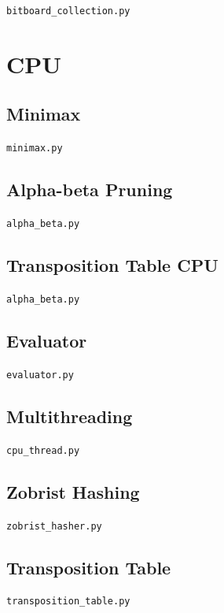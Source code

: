\documentclass[../main/main.tex]{subfiles}
\begin{document}
\noindent\verb|bitboard_collection.py|


\section{CPU}
\subsection{Minimax}
\noindent\verb|minimax.py|


\subsection{Alpha-beta Pruning}
\noindent\verb|alpha_beta.py|


\subsection{Transposition Table CPU}
\noindent\verb|alpha_beta.py|


\subsection{Evaluator}
\noindent\verb|evaluator.py|


\subsection{Multithreading}
\noindent\verb|cpu_thread.py|


\subsection{Zobrist Hashing}
\noindent\verb|zobrist_hasher.py|


\subsection{Transposition Table}
\noindent\verb|transposition_table.py|

\end{document}
